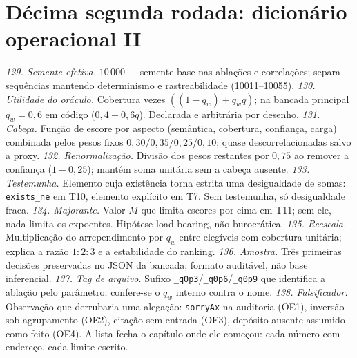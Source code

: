 \section{Décima segunda rodada: dicionário operacional II}
\textit{129. Semente efetiva.} $10\,000+$ semente-base nas ablações e correlações; separa sequências mantendo determinismo e rastreabilidade (10011--10055).
\textit{130. Utilidade do oráculo.} Cobertura vezes $((1-q_w)+q_wq)$; na bancada principal $q_w=0{,}6$ em código ($0{,}4+0{,}6q$). Declarada e arbitrária por desenho.
\textit{131. Cabeça.} Função de escore por aspecto (semântica, cobertura, confiança, carga) combinada pelos pesos fixos $0{,}30/0{,}35/0{,}25/0{,}10$; quase descorrelacionadas salvo a proxy.
\textit{132. Renormalização.} Divisão dos pesos restantes por $0{,}75$ ao remover a confiança ($1-0{,}25$); mantém soma unitária sem a cabeça ausente.
\textit{133. Testemunha.} Elemento cuja existência torna estrita uma desigualdade de somas: \texttt{exists\_ne} em T10, elemento explícito em T7. Sem testemunha, só desigualdade fraca.
\textit{134. Majorante.} Valor $M$ que limita escores por cima em T11; sem ele, nada limita os expoentes. Hipótese load-bearing, não burocrática.
\textit{135. Reescala.} Multiplicação do arrependimento por $q_w$ entre elegíveis com cobertura unitária; explica a razão $1{:}2{:}3$ e a estabilidade do ranking.
\textit{136. Amostra.} Três primeiras decisões preservadas no JSON da bancada; formato auditável, não base inferencial.
\textit{137. Tag de arquivo.} Sufixo \texttt{\_q0p3}/\texttt{\_q0p6}/\texttt{\_q0p9} que identifica a ablação pelo parâmetro; confere-se o $q_w$ interno contra o nome.
\textit{138. Falsificador.} Observação que derrubaria uma alegação: \texttt{sorryAx} na auditoria (OE1), inversão sob agrupamento (OE2), citação sem entrada (OE3), depósito ausente assumido como feito (OE4). A lista fecha o capítulo onde ele começou: cada número com endereço, cada limite escrito.

